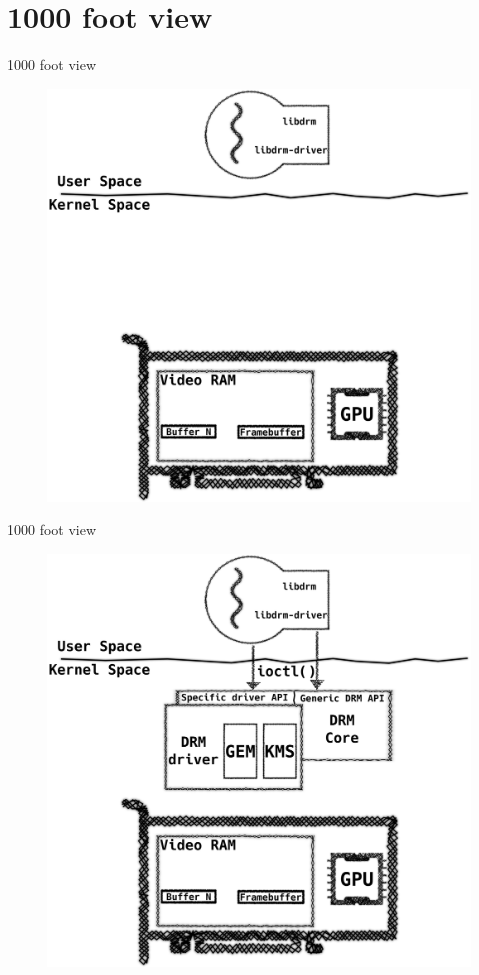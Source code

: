 \documentclass[10pt, compress, aspectratio=169]{beamer}
\begin{document}
\section{1000 foot view}
\begin{frame}{1000 foot view}
  \begin{figure}
    \centering
    \includegraphics[width=\linewidth,
                     height=0.8\textheight,
                     keepaspectratio]{drm_api_1}
  \end{figure}
\end{frame}


\begin{frame}{1000 foot view}
  \begin{figure}
    \centering
    \includegraphics[width=\linewidth,
                     height=0.8\textheight,
                     keepaspectratio]{drm_api_2}
  \end{figure}
\end{frame}
\end{document}
